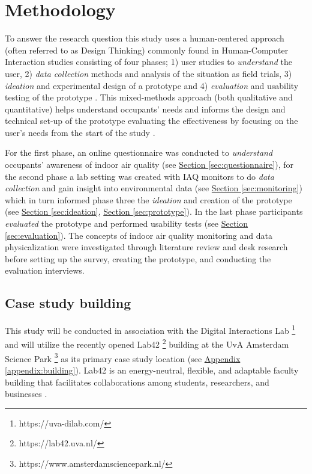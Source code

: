 \section{Methodology}
\label{sec:methodology}

To answer the research question this study uses a human-centered approach (often referred to as Design Thinking) commonly found in Human-Computer Interaction studies consisting of four phases; 1) user studies to \textit{understand} the user, 2) \textit{data collection} methods and analysis of the situation as field trials, 3) \textit{ideation} and experimental design of a prototype and 4) \textit{evaluation} and usability testing of the prototype \cite{jonathan_lazar_research_2017, zimmerman_research_2007}. This mixed-methods approach (both qualitative and quantitative)  helps understand occupants' needs and informs the design and technical set-up of the prototype evaluating the effectiveness by focusing on the user's needs from the start of the study \cite{rogers_moving_2017, experience_ux_2024}. 

For the first phase, an online questionnaire was conducted to \textit{understand} occupants' awareness of indoor air quality (see \hyperref[sec:questionnaire]{Section \ref*{sec:questionnaire}}), for the second phase a lab setting was created with IAQ monitors to do \textit{data collection} and gain insight into environmental data (see \hyperref[sec:monitoring]{Section \ref*{sec:monitoring}}) which in turn informed phase three the \textit{ideation} and creation of the prototype (see \hyperref[sec:ideation]{Section \ref*{sec:ideation}}, \hyperref[sec:prototype]{Section \ref*{sec:prototype}}). In the last phase participants \textit{evaluated} the prototype and performed usability tests (see \hyperref[sec:evaluation]{Section \ref*{sec:evaluation}}). The concepts of indoor air quality monitoring and data physicalization were investigated through literature review and desk research before setting up the survey, creating the prototype, and conducting the evaluation interviews.

\subsection{Case study building}

This study will be conducted in association with the Digital Interactions Lab \footnote{https://uva-dilab.com/} and will utilize the recently opened Lab42 \footnote{https://lab42.uva.nl/} building at the UvA Amsterdam Science Park \footnote{https://www.amsterdamsciencepark.nl/} as its primary case study location (see \hyperref[appendix:building]{Appendix \ref*{appendix:building}}). Lab42 is an energy-neutral, flexible, and adaptable faculty building that facilitates collaborations among students, researchers, and businesses \cite{benthem_2022}. 

